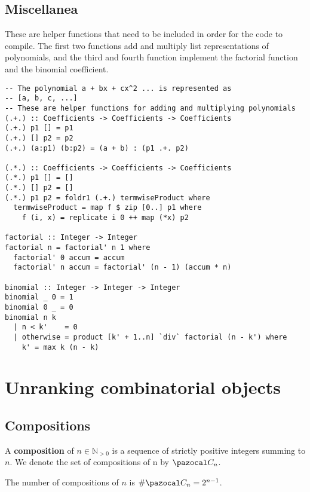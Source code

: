 \subsection{Miscellanea}
These are helper functions that need to be included in order for the
code to compile. The first two functions add and multiply list representations
of polynomials, and the third and fourth function implement the factorial
function and the binomial coefficient.
\begin{singlespace}\begin{verbatim}
-- The polynomial a + bx + cx^2 ... is represented as
-- [a, b, c, ...]
-- These are helper functions for adding and multiplying polynomials
(.+.) :: Coefficients -> Coefficients -> Coefficients
(.+.) p1 [] = p1
(.+.) [] p2 = p2
(.+.) (a:p1) (b:p2) = (a + b) : (p1 .+. p2)

(.*.) :: Coefficients -> Coefficients -> Coefficients
(.*.) p1 [] = []
(.*.) [] p2 = []
(.*.) p1 p2 = foldr1 (.+.) termwiseProduct where
  termwiseProduct = map f $ zip [0..] p1 where
    f (i, x) = replicate i 0 ++ map (*x) p2

factorial :: Integer -> Integer
factorial n = factorial' n 1 where
  factorial' 0 accum = accum
  factorial' n accum = factorial' (n - 1) (accum * n)

binomial :: Integer -> Integer -> Integer
binomial _ 0 = 1
binomial 0 _ = 0
binomial n k
  | n < k'    = 0
  | otherwise = product [k' + 1..n] `div` factorial (n - k') where
    k' = max k (n - k)
\end{verbatim}\end{singlespace}

\section{Unranking combinatorial objects}
\label{apndx:unranking}
\subsection{Compositions}
\begin{definition}
  A \textbf{composition} of $n \in \mathbb{N}_{>0}$ is a sequence of
  strictly positive integers summing to $n$. We denote the set of compositions
  of n by $\pazocal C_n$.
\end{definition}

\begin{lemma} %
  The number of compositions of $n$ is $\#\pazocal C_n = 2^{n-1}$.
\end{lemma}

